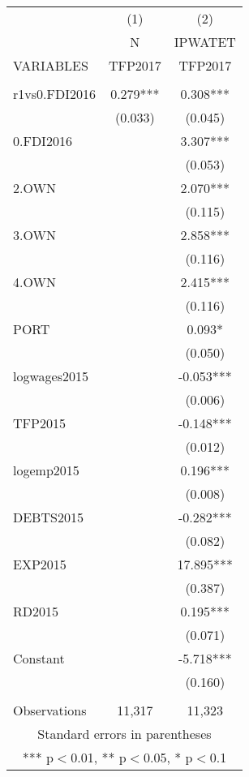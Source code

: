 \documentclass[]{article}
\begin{document}
\begin{tabular}{lcc} \hline
 & (1) & (2) \\
 & N & IPWATET \\
VARIABLES & TFP2017 & TFP2017 \\ \hline
 &  &  \\
r1vs0.FDI2016 & 0.279*** & 0.308*** \\
 & (0.033) & (0.045) \\
0.FDI2016 &  & 3.307*** \\
 &  & (0.053) \\
2.OWN &  & 2.070*** \\
 &  & (0.115) \\
3.OWN &  & 2.858*** \\
 &  & (0.116) \\
4.OWN &  & 2.415*** \\
 &  & (0.116) \\
PORT &  & 0.093* \\
 &  & (0.050) \\
logwages2015 &  & -0.053*** \\
 &  & (0.006) \\
TFP2015 &  & -0.148*** \\
 &  & (0.012) \\
logemp2015 &  & 0.196*** \\
 &  & (0.008) \\
DEBTS2015 &  & -0.282*** \\
 &  & (0.082) \\
EXP2015 &  & 17.895*** \\
 &  & (0.387) \\
RD2015 &  & 0.195*** \\
 &  & (0.071) \\
Constant &  & -5.718*** \\
 &  & (0.160) \\
 &  &  \\
 Observations & 11,317 & 11,323 \\ \hline
\multicolumn{3}{c}{ Standard errors in parentheses} \\
\multicolumn{3}{c}{ *** p$<$0.01, ** p$<$0.05, * p$<$0.1} \\
\end{tabular}
\end{document}
